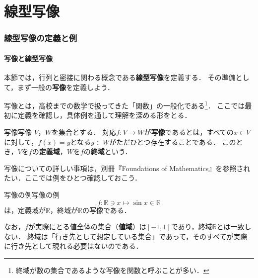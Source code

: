 \part{線型写像}

\begin{abstract}
  この章では，行列と密接に関わる概念である\textbf{線型写像}を定義する．
  まず一般の写像を定義したうえで，「和とスカラー倍を保つ」写像として線型写像を定義し，
  対称移動・正射影・回転といった幾何的な変換から，多項式の微分・積分や数列の階差・部分和にいたるまで，
  さまざまな例を確認する．
  次に，$K^n$から$K^m$への線型写像が$m \times n$行列とちょうど一対一に対応することを示し，
  行列の積が写像の合成に対応していることを見る．
  最後に，線型写像に付随する基本的な集合として像と核を導入し，
  それらが連立一次方程式のことばで言い換えられることを確かめる．
\end{abstract}

\section{線型写像の定義と例}

\subsection{写像と線型写像}

本節では，行列と密接に関わる概念である\textbf{線型写像}を定義する．
その準備として，まず一般の\textbf{写像}を定義しよう．

写像とは，高校までの数学で扱ってきた「関数」の一般化である\footnote{終域が数の集合であるような写像を関数と呼ぶことが多い．}．
ここでは最初に定義を確認し，具体例を通して理解を深める形をとる．

\begin{definition}{写像}{写像}
  $V$，$W$を集合とする．
  対応$f \colon V \to W$が\textbf{写像}であるとは，すべての$x \in V$に対して，$f(x) = y$となる$y \in W$がただひとつ存在することである．
  このとき，$V$を$f$の\textbf{定義域}，$W$を$f$の\textbf{終域}という．
\end{definition}

写像についての詳しい事項は，別冊『Foundations of Mathematics』を参照されたい．ここでは例をひとつ確認しておこう．

\begin{example}{写像の例}{写像の例}
  \[
   f\colon \mathbb{R} \ni x \mapsto \sin x \in \mathbb{R}
  \]
  は，定義域が$\mathbb{R}$，終域が$\mathbb{R}$の写像である．

  なお，$f$が実際にとる値全体の集合（\textbf{値域}）は$[-1, 1]$であり，終域$\mathbb{R}$とは一致しない．
  終域は「行き先として想定している集合」であって，そのすべてが実際に行き先として現れる必要はないのである．
\end{example}

